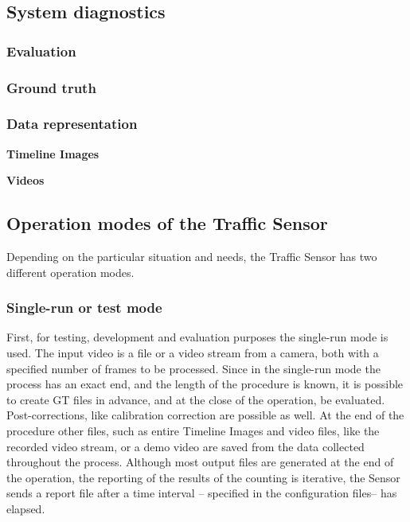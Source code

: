 \subsection{System diagnostics}
\subsubsection{Evaluation}
	\subsubsection{Ground truth}


\subsubsection{Data representation}
\textbf{Timeline Images}

\textbf{Videos}
\subsection{Operation modes of the Traffic Sensor}
Depending on the particular situation and needs, the Traffic Sensor has two different operation modes.
\subsubsection{Single-run or test mode}\label{sec:run_modes}
First, for testing, development and evaluation purposes the single-run mode is used.
The input video is a file or a video stream from a camera, both with a specified number of frames to be processed.
Since in the single-run mode the process has an exact end, and the length of the procedure is known, it is possible to create GT files in advance, and at the close of the operation, be evaluated.
Post-corrections, like calibration correction are possible as well.
At the end of the procedure other files, such as entire Timeline Images and video files, like the recorded video stream, or a demo video are saved from the data collected throughout the process.
Although most output files are generated at the end of the operation, the reporting of the results of the counting is iterative, the Sensor sends a report file after a time interval -- specified in the configuration files-- has elapsed.

